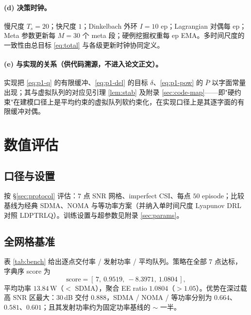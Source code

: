 \documentclass[UTF8,11pt,a4paper]{ctexart}
\theoremstyle{plain}
\theoremstyle{definition}
\theoremstyle{remark}
\begin{document}
\paragraph{(d) 决策时钟。} 慢尺度 $T_s=20$；快尺度 $1$；Dinkelbach 外环 $I=10$ ep；Lagrangian 对偶每 ep；Meta 参数更新每 $M{=}30$ 个 meta 段；硬例挖掘权重每 ep EMA。多时间尺度的一致性由总目标 \eqref{eq:total} 与各级更新时钟协同定义。

\paragraph{(e) 与实现的关系（供代码溯源，不进入论文正文）。} 实现把 \eqref{eq:p1-q} 的有限缓冲、\eqref{eq:p1-del} 的目标 $\delta$、\eqref{eq:p1-pow} 的 $\bar P$ 以字面常量出现；其与虚拟队列的对应见引理 \ref{lem:stab} 及附录 \ref{sec:code-map}——即"硬约束"在建模口径上是平均约束的虚拟队列软约束化，在实现口径上是其逐字面的有限缓冲对偶。

\section{数值评估} \label{sec:results}

\subsection{口径与设置} \label{sec:results-setup}

按 \S\ref{sec:protocol} 评估：$7$ 点 SNR 网格、imperfect CSI、每点 $50$ episode；比较基线为经典 SDMA、NOMA 与等功率方案（并纳入单时间尺度 Lyapunov DRL 对照 LDPTRLQ）。训练设置与超参数见附录 \ref{sec:params}。

\subsection{全网格基准} \label{sec:results-bench}

表 \ref{tab:bench} 给出逐点交付率 / 发射功率 / 平均队列。策略在全部 $7$ 点达标，字典序 score 为
\begin{equation}
  \mathrm{score} = [\,7,\ 0.9519,\ -8.3971,\ 1.0804\,],
\end{equation}
平均功率 $13.84$\,W（$<$ SDMA），聚合 EE ratio $1.0804$（$>1.05$）。优势在深过载高 SNR 区最大：$30$\,dB 交付 $0.888$，SDMA / NOMA / 等功率分别为 $0.664$、$0.581$、$0.601$；且其发射功率约为固定功率基线的 $\sim$ 一半。
\end{document}
